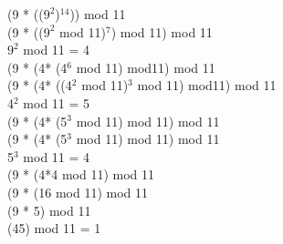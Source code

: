 (9 * (($9^{2}$)$^{14}$)) mod 11 \\

(9 * (($9^{2}$ mod 11)$^{7}$) mod 11) mod 11 \\

$9^{2}$ mod 11 = 4 \\

(9 * (4* (4$^{6}$ mod 11) mod11) mod 11 \\

(9 * (4* ((4$^{2}$ mod 11)$^{3}$ mod 11) mod11) mod 11 \\

4$^{2}$ mod 11 = 5 \\

(9 * (4* (5$^{3}$ mod 11) mod 11) mod 11 \\

(9 * (4* (5$^{3}$ mod 11) mod 11) mod 11 \\

5$^{3}$ mod 11 = 4 \\

(9 * (4*4 mod 11) mod 11 \\

(9 * (16 mod 11) mod 11 \\

(9 * 5) mod 11 \\

(45) mod 11 = 1 \\
